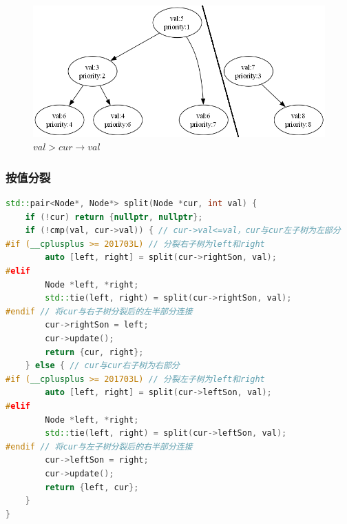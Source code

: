 \documentclass[utf8]{ctexbeamer}
\begin{document}
\begin{frame}[fragile]
\begin{figure}
\begin{minipage}[b]{0.4\textwidth}
                \caption{$val>cur\rightarrow val$}
            \end{minipage}
            \hfill
            \begin{minipage}[b]{0.4\textwidth}
                \includegraphics[width=\linewidth]{images/Treap_split2.png}
                \caption{$val>cur\rightarrow val$}
            \end{minipage}
        \end{figure}    
    \end{frame}

    \begin{frame}[fragile]
        \frametitle{按值分裂}
        \begin{lstlisting}[language=c++]
std::pair<Node*, Node*> split(Node *cur, int val) {
    if (!cur) return {nullptr, nullptr};
    if (!cmp(val, cur->val)) { // cur->val<=val，cur与cur左子树为左部分
#if (__cplusplus >= 201703L) // 分裂右子树为left和right
        auto [left, right] = split(cur->rightSon, val);
#elif
        Node *left, *right;
        std::tie(left, right) = split(cur->rightSon, val);
#endif // 将cur与右子树分裂后的左半部分连接
        cur->rightSon = left; 
        cur->update();
        return {cur, right};
    } else { // cur与cur右子树为右部分
#if (__cplusplus >= 201703L) // 分裂左子树为left和right
        auto [left, right] = split(cur->leftSon, val);
#elif
        Node *left, *right;
        std::tie(left, right) = split(cur->leftSon, val);
#endif // 将cur与左子树分裂后的右半部分连接
        cur->leftSon = right;
        cur->update();
        return {left, cur};
    }
}
        \end{lstlisting}
    \end{frame}
\end{document}

